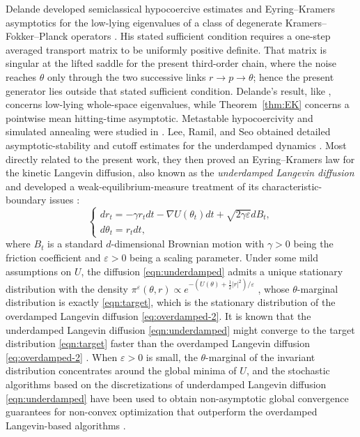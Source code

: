 \documentclass[11pt]{article}
\numberwithin{equation}{section}
\theoremstyle{plain}
\theoremstyle{definition}
\theoremstyle{remark}
\newcommand{\eps}{\varepsilon}
\begin{document}
Delande developed semiclassical hypocoercive estimates and
Eyring--Kramers asymptotics for the low-lying eigenvalues of a class of
degenerate Kramers--Fokker--Planck operators
\cite[Assumption~6 and Theorems~1--2]{Delande2026KFP}.
His stated sufficient condition requires a one-step averaged transport matrix
to be uniformly positive definite.  That matrix is singular at the lifted
saddle for the present third-order chain, where the noise reaches
$\theta$ only through the two successive links $r\to p\to\theta$;
hence the present generator lies outside that stated sufficient condition.
Delande's result, like \cite{BonyLePeutrecMichel2025}, concerns low-lying
whole-space eigenvalues, while Theorem~\ref{thm:EK} concerns a pointwise mean
hitting-time asymptotic.
Metastable hypocoercivity and simulated annealing were studied in
\cite{Monmarche2018}.
Lee, Ramil, and Seo obtained detailed asymptotic-stability and cutoff estimates
for the underdamped dynamics \cite{LeeRamilSeo2023Cutoff}.  Most directly
related to the present work, they then proved an Eyring--Kramers law for the
kinetic Langevin diffusion, also known as the \textit{underdamped Langevin diffusion} and developed a weak-equilibrium-measure treatment
of its characteristic-boundary issues \cite{LeeRamilSeo2026}:
\begin{equation}\label{eqn:underdamped}
\begin{cases}
dr_{t}=-\gamma r_{t}dt-\nabla U(\theta_{t})dt+\sqrt{2\gamma\varepsilon}dB_{t},\\
d\theta_{t}=r_{t}dt,
\end{cases}
\end{equation}
where $B_{t}$ is a standard $d$-dimensional Brownian motion
with $\gamma>0$ being the friction coefficient and $\varepsilon>0$ being a scaling parameter.
Under some mild assumptions on $U$, the diffusion \eqref{eqn:underdamped} admits a unique stationary distribution with the density $\pi^{\varepsilon}(\theta,r) \propto e^{-(U(\theta)+\frac{1}{2}|r|^{2})/\varepsilon}$ \cite{Eberle}, whose $\theta$-marginal distribution is exactly \eqref{eqn:target},
which is the stationary distribution of the overdamped Langevin diffusion \eqref{eq:overdamped-2}.
It is known that the underdamped Langevin diffusion \eqref{eqn:underdamped} might converge to the target distribution \eqref{eqn:target} faster than the overdamped Langevin diffusion \eqref{eq:overdamped-2} \cite{Eberle,JianfengLu}.
When $\eps>0$ is small, 
the $\theta$-marginal of the invariant distribution concentrates around the global minima of $U$, and the stochastic algorithms based on the discretizations of underdamped Langevin diffusion \eqref{eqn:underdamped} have been used
to obtain non-asymptotic global convergence guarantees for non-convex optimization that outperform
the overdamped Langevin-based 
algorithms \cite{GGZ,Chau2022}.
\end{document}
